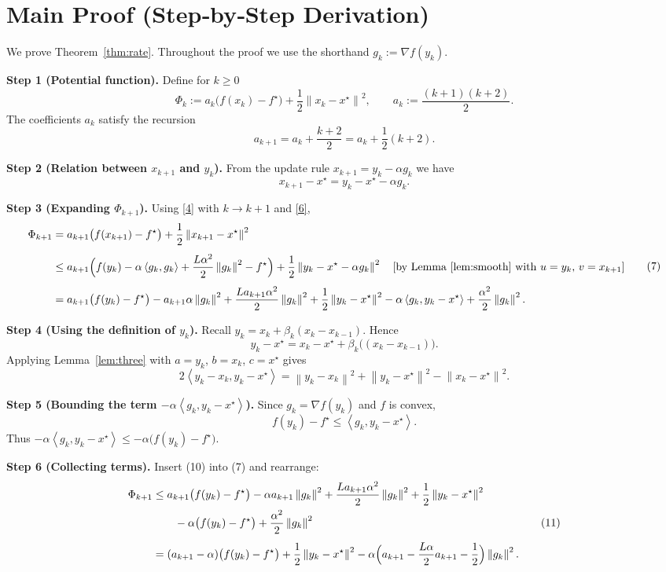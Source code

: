 \documentclass{article}
\newcommand{\norm}[1]{\left\|#1\right\|}
\newcommand{\ip}[2]{\left\langle #1,#2\right\rangle}
\newcommand{\grad}{\nabla}
\begin{document}
\section*{Main Proof (Step‑by‑Step Derivation)}
We prove Theorem~\ref{thm:rate}. Throughout the proof we use the shorthand $g_k:=\grad f(y_k)$.

\bigskip
\noindent\textbf{Step 1 (Potential function).}  
Define for $k\ge 0$
\[
\Phi_k:= a_k\bigl(f(x_k)-f^{\star}\bigr)+\frac{1}{2}\norm{x_k-x^{\star}}^{2},
\qquad a_k:=\frac{(k+1)(k+2)}{2}.
\tag{4}
\]
The coefficients $a_k$ satisfy the recursion
\[
a_{k+1}=a_k+\frac{k+2}{2}=a_k+\frac{1}{2}(k+2).
\tag{5}
\]

\noindent\textbf{Step 2 (Relation between $x_{k+1}$ and $y_k$).}  
From the update rule $x_{k+1}=y_k-\alpha g_k$ we have
\[
x_{k+1}-x^{\star}=y_k-x^{\star}-\alpha g_k .
\tag{6}
\]

\noindent\textbf{Step 3 (Expanding $\Phi_{k+1}$).}  
Using \eqref{4} with $k\!\to\!k+1$ and \eqref{6},
\[
\begin{aligned}
\Phi_{k+1}
&=a_{k+1}\bigl(f(x_{k+1})-f^{\star}\bigr)+\frac12\norm{x_{k+1}-x^{\star}}^{2}\\[4pt]
&\le a_{k+1}\Bigl(f(y_k)-\alpha\ip{g_k}{g_k}+\frac{L\alpha^{2}}{2}\norm{g_k}^{2}-f^{\star}\Bigr)
      +\frac12\norm{y_k-x^{\star}-\alpha g_k}^{2} \quad\text{[by Lemma~\ref{lem:smooth} with $u=y_k$, $v=x_{k+1}$]}\\[4pt]
&= a_{k+1}\bigl(f(y_k)-f^{\star}\bigr)-a_{k+1}\alpha\norm{g_k}^{2}
   +\frac{L a_{k+1}\alpha^{2}}{2}\norm{g_k}^{2}
   +\frac12\norm{y_k-x^{\star}}^{2}
   -\alpha\ip{g_k}{y_k-x^{\star}}+\frac{\alpha^{2}}{2}\norm{g_k}^{2}.
\end{aligned}
\tag{7}
\]

\noindent\textbf{Step 4 (Using the definition of $y_k$).}  
Recall $y_k=x_k+\beta_k(x_k-x_{k-1})$. Hence
\[
y_k-x^{\star}=x_k-x^{\star}+\beta_k\bigl((x_k-x_{k-1})\bigr).
\tag{8}
\]
Applying Lemma~\ref{lem:three} with $a=y_k$, $b=x_k$, $c=x^{\star}$ gives
\[
2\ip{y_k-x_k}{y_k-x^{\star}}=
\norm{y_k-x_k}^{2}+\norm{y_k-x^{\star}}^{2}-\norm{x_k-x^{\star}}^{2}.
\tag{9}
\]

\noindent\textbf{Step 5 (Bounding the term $- \alpha\ip{g_k}{y_k-x^{\star}}$).}  
Since $g_k=\grad f(y_k)$ and $f$ is convex,
\[
f(y_k)-f^{\star}\le \ip{g_k}{y_k-x^{\star}} .
\tag{10}
\]
Thus $-\alpha\ip{g_k}{y_k-x^{\star}}\le -\alpha\bigl(f(y_k)-f^{\star}\bigr)$.

\noindent\textbf{Step 6 (Collecting terms).}  
Insert (10) into (7) and rearrange:
\[
\begin{aligned}
\Phi_{k+1}
&\le a_{k+1}\bigl(f(y_k)-f^{\star}\bigr)-\alpha a_{k+1}\norm{g_k}^{2}
   +\frac{L a_{k+1}\alpha^{2}}{2}\norm{g_k}^{2}
   +\frac12\norm{y_k-x^{\star}}^{2}\\
&\qquad -\alpha\bigl(f(y_k)-f^{\star}\bigr)+\frac{\alpha^{2}}{2}\norm{g_k}^{2}\\[4pt]
&= (a_{k+1}-\alpha)\bigl(f(y_k)-f^{\star}\bigr)
   +\frac12\norm{y_k-x^{\star}}^{2}
   -\alpha\Bigl(a_{k+1}-\frac{L\alpha}{2}a_{k+1}-\frac12\Bigr)\norm{g_k}^{2}.
\end{aligned}
\tag{11}
\]
\end{document}
